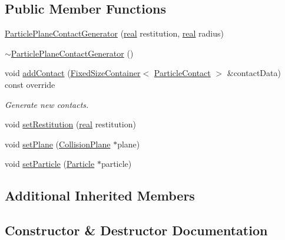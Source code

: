 \subsection*{Public Member Functions}
\begin{DoxyCompactItemize}
\item 
\mbox{\hyperlink{classr3_1_1_particle_plane_contact_generator_ada48734f8fe0eaf4909e92a3b3b30703}{Particle\+Plane\+Contact\+Generator}} (\mbox{\hyperlink{namespacer3_ab2016b3e3f743fb735afce242f0dc1eb}{real}} restitution, \mbox{\hyperlink{namespacer3_ab2016b3e3f743fb735afce242f0dc1eb}{real}} radius)
\item 
\mbox{\hyperlink{classr3_1_1_particle_plane_contact_generator_a95b702cf6711f98e6c8cb6d760944e52}{$\sim$\+Particle\+Plane\+Contact\+Generator}} ()
\item 
void \mbox{\hyperlink{classr3_1_1_particle_plane_contact_generator_a7114ab68dd301e05ebc493f2b440bc43}{add\+Contact}} (\mbox{\hyperlink{classr3_1_1_fixed_size_container}{Fixed\+Size\+Container}}$<$ \mbox{\hyperlink{classr3_1_1_particle_contact}{Particle\+Contact}} $>$ \&contact\+Data) const override
\begin{DoxyCompactList}\small\item\em Generate new contacts. \end{DoxyCompactList}\item 
void \mbox{\hyperlink{classr3_1_1_particle_plane_contact_generator_ad76fbd878fbcad8ee71f6cb70031e49d}{set\+Restitution}} (\mbox{\hyperlink{namespacer3_ab2016b3e3f743fb735afce242f0dc1eb}{real}} restitution)
\item 
void \mbox{\hyperlink{classr3_1_1_particle_plane_contact_generator_a80fe5bbcb79304f020bf23a56651b833}{set\+Plane}} (\mbox{\hyperlink{classr3_1_1_collision_plane}{Collision\+Plane}} $\ast$plane)
\item 
void \mbox{\hyperlink{classr3_1_1_particle_plane_contact_generator_a2df4ea0456118fdd9016e61c56954b2a}{set\+Particle}} (\mbox{\hyperlink{classr3_1_1_particle}{Particle}} $\ast$particle)
\end{DoxyCompactItemize}
\subsection*{Additional Inherited Members}


\subsection{Constructor \& Destructor Documentation}
\mbox{\label{classr3_1_1_particle_plane_contact_generator_ada48734f8fe0eaf4909e92a3b3b30703}} 
